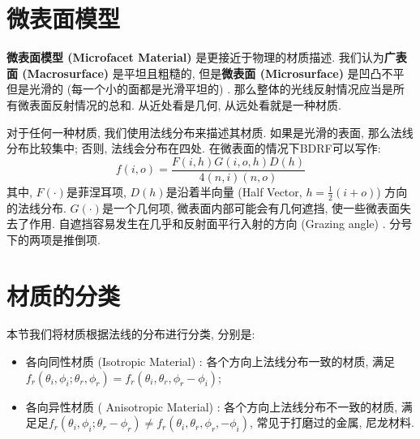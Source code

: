 \section{微表面模型}

\textbf{微表面模型 (Microfacet Material) }是更接近于物理的材质描述. 我们认为\textbf{广表面 (Macrosurface) }是平坦且粗糙的, 但是\textbf{微表面 (Microsurface) }是凹凸不平但是光滑的 (每一个小的面都是光滑平坦的) . 那么整体的光线反射情况应当是所有微表面反射情况的总和. 从近处看是几何, 从远处看就是一种材质. 

对于任何一种材质, 我们使用法线分布来描述其材质. 如果是光滑的表面, 那么法线分布比较集中; 否则, 法线会分布在四处. 在微表面的情况下BDRF可以写作: 
\begin{equation}
	f(i,o)=\frac{F(i,h)G(i,o,h)D(h)}{4(n,i)(n,o)}
\end{equation}
其中, $F(\cdot)$是菲涅耳项, $D(h)$是沿着半向量 (Half Vector, $h=\frac{1}{2}(i+o)$) 方向的法线分布. $G(\cdot)$是一个几何项, 微表面内部可能会有几何遮挡, 使一些微表面失去了作用. 自遮挡容易发生在几乎和反射面平行入射的方向 (Grazing angle) . 分号下的两项是推倒项. 

\section{材质的分类}

本节我们将材质根据法线的分布进行分类, 分别是: 
\begin{itemize}
	\item 各向同性材质 (Isotropic Material) : 各个方向上法线分布一致的材质, 满足$f_r(\theta_i,\phi_i;\theta_r,\phi_r)=f_r(\theta_i,\theta_r,\phi_r-\phi_i)$; 
	\item 各向异性材质 ( Anisotropic Material) : 各个方向上法线分布不一致的材质, 满足足$f_r(\theta_i,\phi_i;\theta_r-\phi_r)\neq f_r(\theta_i,\theta_r,\phi_r,-\phi_i)$, 常见于打磨过的金属, 尼龙材料. 
\end{itemize}

